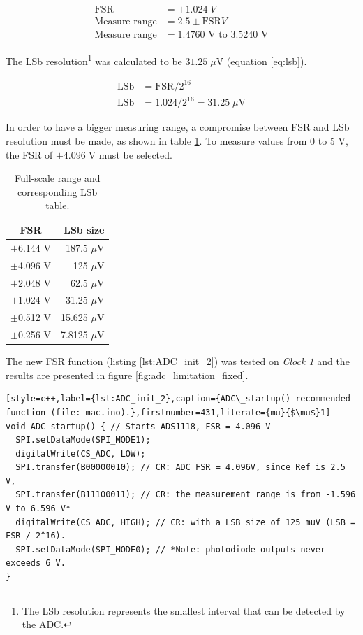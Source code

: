 \documentclass[a4paper,12pt]{article}
\begin{document}
\begin{align}
\text{FSR} &= \pm 1.024\; V\nonumber\\
\text{Measure range}&=2.5 \pm \text{FSR} V\nonumber\\
\text{Measure range}&= 1.4760 \text{ V to } 3.5240 \text{ V}
\label{eq:full_range_1}
\end{align}

The LSb resolution\footnote{The LSb resolution represents the smallest interval that can be detected by the ADC.} was calculated to be $31.25 \;\mu \mathrm{V}$ (equation \ref{eq:lsb}).

\begin{align}
\text{LSb} &= \text{FSR}/2^{16} \nonumber\\
\text{LSb} &= \text{1.024}/2^{16} = 31.25 \;\mu \mathrm{V}
\label{eq:lsb}
\end{align}

In order to have a bigger measuring range, a compromise between FSR and LSb resolution must be made, as shown in table \ref{table:FSR}. To measure values from 0 to 5 V, the FSR of $\pm 4.096 \;\mathrm{V}$ must be selected. 

\begin{table}[h!]
\centering
\begin{tabular}{|c|r|}
\hline
\textbf{FSR} & \textbf{LSb size} \\ \hline
$\pm$6.144 V     & 187.5 $\mu$V          \\ \hline
$\pm$4.096 V     & 125 $\mu$V            \\ \hline
$\pm$2.048 V     & 62.5 $\mu$V           \\ \hline
$\pm$1.024 V     & 31.25 $\mu$V          \\ \hline
$\pm$0.512 V     & 15.625 $\mu$V         \\ \hline
$\pm$0.256 V     & 7.8125 $\mu$V         \\ \hline
\end{tabular}
\caption{Full-scale range and corresponding LSb table.}
\label{table:FSR}
\end{table}
The new FSR function (listing \ref{lst:ADC_init_2}) was tested on \textit{Clock 1} and the results are presented in figure \ref{fig:adc_limitation_fixed}.

\begin{lstlisting}[style=c++,label={lst:ADC_init_2},caption={ADC\_startup() recommended function (file: mac.ino).},firstnumber=431,literate={mu}{$\mu$}1]
void ADC_startup() { // Starts ADS1118, FSR = 4.096 V
  SPI.setDataMode(SPI_MODE1);
  digitalWrite(CS_ADC, LOW);
  SPI.transfer(B00000010); // CR: ADC FSR = 4.096V, since Ref is 2.5 V, 
  SPI.transfer(B11100011); // CR: the measurement range is from -1.596 V to 6.596 V*
  digitalWrite(CS_ADC, HIGH); // CR: with a LSB size of 125 muV (LSB = FSR / 2^16).
  SPI.setDataMode(SPI_MODE0); // *Note: photodiode outputs never exceeds 6 V.
}
\end{lstlisting}
\end{document}
